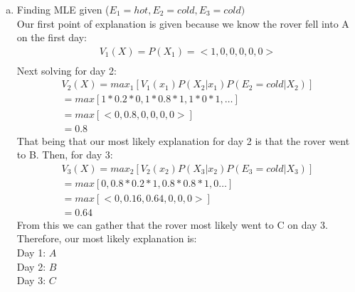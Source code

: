 \documentclass{article}
\begin{document}
\begin{enumerate}[a)]
    \clearpage
    \item Finding MLE given ($E_1=hot, E_2=cold, E_3=cold)$\\
    Our first point of explanation is given because we know the rover fell into A
    on the first day:
    \begin{gather*}
        V_1(X) = P(X_1) = <1, 0, 0, 0, 0, 0>\\
    \end{gather*}
    Next solving for day 2:
    \begin{gather*}
        V_2(X) = max_1[V_1(x_1)P(X_2|x_1)P(E_2 = cold | X_2)]\\
        = max[1 * 0.2 * 0, 1 * 0.8 * 1, 1 * 0 * 1, \ldots]\\
        = max[<0, 0.8, 0, 0, 0, 0>]\\
        = 0.8
    \end{gather*}
    That being that our most likely explanation for day 2 is that the rover went to B.
    Then, for day 3:
    \begin{gather*}
        V_3(X) = max_2[V_2(x_2)P(X_3|x_2) P(E_3 = cold | X_3)]\\
        =  max [0, 0.8 * 0.2 * 1, 0.8 * 0.8 * 1, 0 \ldots]\\
        = max [<0, 0.16, 0.64, 0, 0, 0>]\\
        = 0.64
    \end{gather*}
    From this we can gather that the rover most likely went to C on day 3.
    Therefore, our most likely explanation is:\\
    Day 1: $A$\\
    Day 2: $B$\\
    Day 3: $C$
    

\end{enumerate}
\end{document}
